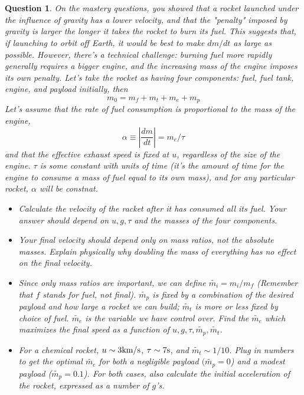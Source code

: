 \documentclass{article}
\newtheorem{question}{Question}
\begin{document}
\section{}%
\begin{question}\label{q5}
    On the mastery questions, you showed that a rocket launched under the influence of gravity has a lower velocity, and that the "penalty" imposed by gravity is larger the longer it takes the rocket to burn its fuel. This suggests that, if launching to orbit off Earth, it would be best to make $dm/dt$ as large as possible. However, there's a technical challenge: burning fuel more rapidly generally requires a bigger engine, and the increasing mass of the engine imposes its own penalty. Let's take the rocket as having four components: fuel, fuel tank, engine, and payload initially, then 
    $$m_0 = m_f + m_t+m_e+m_p$$
    Let's assume that the rate of fuel consumption is proportional to the mass of the engine, 
    $$\alpha \equiv \left|\frac{dm}{dt}\right|=m_e/\tau$$
    and that the effective exhaust speed is fixed at $u$, regardless of the size of the engine. $\tau$ is some constant with units of time (it's the amount of time for the engine to consume a mass of fuel equal to its own mass), and for any particular rocket, $\alpha$ will be constnat.
    \begin{itemize}
        \item[(a)] Calculate the velocity of the racket after it has consumed all its fuel. Your answer should depend on $u,g,\tau$ and the masses of the four components.
        \item[(b)] Your final velocity should depend only on mass ratios, not the absolute masses. Explain physically why doubling the mass of everything has no effect on the final velocity.
        \item[(c)]Since only mass ratios are important, we can define $\tilde{m_i} = m_i/m_f$ (Remember that $f$ stands for fuel, not final). $\tilde{m_p}$ is fixed by a combination of the desired payload and how large a rocket we can build; $\tilde{m_t}$ is more or less fixed by choice of fuel. $\tilde{m_e}$ is the variable we have control over. Find the $\tilde{m_e}$ which maximizes the final speed as a function of $u,g,\tau,\tilde{m_p},\tilde{m_t}$.
        \item[(d)]For a chemical rocket, $u\sim 3 \textmd{km/s}$, $\tau\sim 7\textmd{s}$, and $\tilde{m_t}\sim 1/10$. Plug in numbers to get the optimal $\tilde{m_e}$ for both a negligible payload $(\tilde{m_p}=0$) and a modest payload ($\tilde{m_p}=0.1$). For both cases, also calculate the initial acceleration of the rocket, expressed as a number of $g$'s. 
    \end{itemize}
\end{question}
\end{document}
